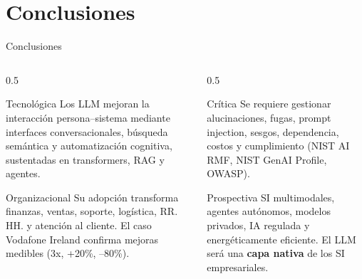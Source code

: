\documentclass[10pt,aspectratio=169]{beamer}
\begin{document}
\section{Conclusiones}
\begin{frame}{Conclusiones}
    \begin{columns}[T]
        \begin{column}{0.5\textwidth}
            \begin{block}{Tecnológica}
                Los LLM mejoran la interacción persona--sistema mediante interfaces conversacionales, búsqueda semántica y automatización cognitiva, sustentadas en transformers, RAG y agentes.
            \end{block}
            \begin{block}{Organizacional}
                Su adopción transforma finanzas, ventas, soporte, logística, RR.\,HH. y atención al cliente. El caso Vodafone Ireland confirma mejoras medibles (3x, +20\%, --80\%).
            \end{block}
        \end{column}
        \begin{column}{0.5\textwidth}
            \begin{alertblock}{Crítica}
                Se requiere gestionar alucinaciones, fugas, prompt injection, sesgos, dependencia, costos y cumplimiento (NIST AI RMF, NIST GenAI Profile, OWASP).
            \end{alertblock}
            \begin{block}{Prospectiva}
                SI multimodales, agentes autónomos, modelos privados, IA regulada y energéticamente eficiente. El LLM será una \textbf{capa nativa} de los SI empresariales.
            \end{block}
        \end{column}
    \end{columns}
\end{frame}
\end{document}
